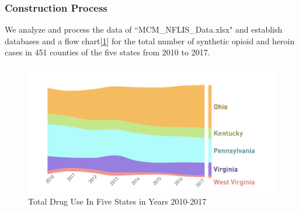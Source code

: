 \documentclass{mcmthesis}
\begin{document}
\subsubsection{Construction Process}
We analyze and process the data of ``MCM\_NFLIS\_Data.xlsx" and establish databases and a flow chart[\ref{sum_flowchart}] for the total number of synthetic opioid and heroin cases in 451 counties of the five states from 2010 to 2017.
\begin{figure}[ht]
	\centering
	\includegraphics[width=15cm]{StateSum.png}
	\caption{Total Drug Use In Five States in Years 2010-2017}\label{sum_flowchart}
\end{figure}
\end{document}
